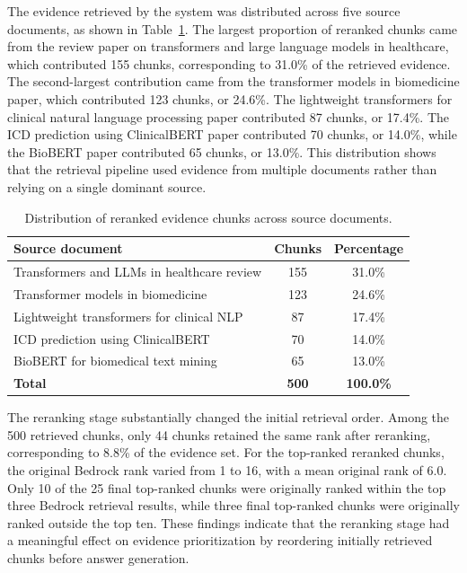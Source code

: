 The evidence retrieved by the system was distributed across five source documents, as shown in Table~\ref{tab:source_distribution}. The largest proportion of reranked chunks came from the review paper on transformers and large language models in healthcare, which contributed 155 chunks, corresponding to 31.0\% of the retrieved evidence. The second-largest contribution came from the transformer models in biomedicine paper, which contributed 123 chunks, or 24.6\%. The lightweight transformers for clinical natural language processing paper contributed 87 chunks, or 17.4\%. The ICD prediction using ClinicalBERT paper contributed 70 chunks, or 14.0\%, while the BioBERT paper contributed 65 chunks, or 13.0\%. This distribution shows that the retrieval pipeline used evidence from multiple documents rather than relying on a single dominant source.

\begin{table}[!t]
\centering
\caption{Distribution of reranked evidence chunks across source documents.}
\label{tab:source_distribution}
\begin{tabular}{lcc}
\hline
\textbf{Source document} & \textbf{Chunks} & \textbf{Percentage} \\
\hline
Transformers and LLMs in healthcare review & 155 & 31.0\% \\
Transformer models in biomedicine & 123 & 24.6\% \\
Lightweight transformers for clinical NLP & 87 & 17.4\% \\
ICD prediction using ClinicalBERT & 70 & 14.0\% \\
BioBERT for biomedical text mining & 65 & 13.0\% \\
\hline
\textbf{Total} & \textbf{500} & \textbf{100.0\%} \\
\hline
\end{tabular}
\end{table}

The reranking stage substantially changed the initial retrieval order. Among the 500 retrieved chunks, only 44 chunks retained the same rank after reranking, corresponding to 8.8\% of the evidence set. For the top-ranked reranked chunks, the original Bedrock rank varied from 1 to 16, with a mean original rank of 6.0. Only 10 of the 25 final top-ranked chunks were originally ranked within the top three Bedrock retrieval results, while three final top-ranked chunks were originally ranked outside the top ten. These findings indicate that the reranking stage had a meaningful effect on evidence prioritization by reordering initially retrieved chunks before answer generation.

